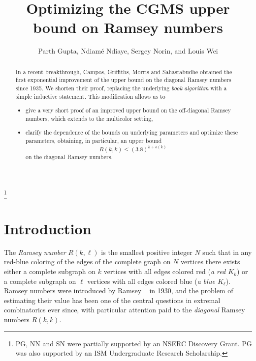 \documentclass[reqno,final,12pt]{amsart}
\begin{document}
	
\title{Optimizing the CGMS upper bound on Ramsey numbers}
\author{Parth Gupta,		
Ndiam\'e Ndiaye,
Sergey Norin,	
 and Louis Wei }
\address{Department of Mathematics and Statistics, McGill University, Montr\'{e}al, QC, Canada.}
\thanks{PG, NN and SN were partially supported by an NSERC Discovery Grant. PG was also supported by an ISM Undergraduate Research Scholarship.
}
\begin{abstract} 
	In a recent breakthrough, Campos, Griffiths, Morris and Sahasrabudhe obtained the first exponential improvement of the upper bound on the diagonal Ramsey numbers since 1935. We shorten their proof, replacing the underlying \emph{book algorithm} with a simple inductive statement. This modification allows us to \begin{itemize} \item give a very short proof of an improved upper bound on the off-diagonal Ramsey numbers, which extends to the multicolor setting,
		\item clarify the dependence of the bounds on underlying parameters and optimize these parameters, obtaining, in particular, an upper bound
		$$R(k,k) \leq (3.8)^{k+o(k)}$$ 
		on the diagonal Ramsey numbers.
		\end{itemize}  
\end{abstract}
	\maketitle
	
	
\section{Introduction} The \emph{Ramsey number} $R(k, \ell)$ is the smallest positive integer $N$ such that
in any red-blue coloring of the edges of the complete graph on $N$ vertices there exists either a complete subgraph on $k$ vertices with all edges colored red (\emph{a red $K_k$}) or a complete subgraph on $\ell$ vertices with all edges colored blue (\emph{a blue $K_{\ell}$}).
Ramsey numbers were introduced by Ramsey ~\cite{R30} in 1930, and the problem of estimating their value has been one of the central questions in extremal combinatorics ever since, with particular attention paid to the \emph{diagonal} Ramsey numbers $R(k,k)$.
	
\end{document}
